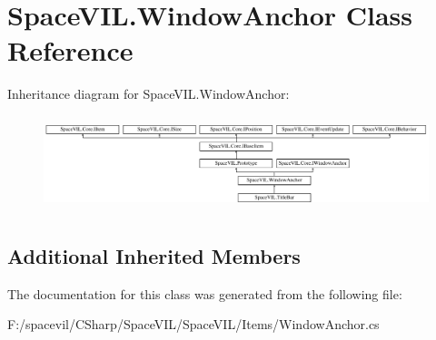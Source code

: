 \hypertarget{class_space_v_i_l_1_1_window_anchor}{}\section{Space\+V\+I\+L.\+Window\+Anchor Class Reference}
\label{class_space_v_i_l_1_1_window_anchor}
Inheritance diagram for Space\+V\+I\+L.\+Window\+Anchor\+:\begin{figure}[H]
\begin{center}
\leavevmode
\includegraphics[height=2.800000cm]{class_space_v_i_l_1_1_window_anchor}
\end{center}
\end{figure}
\subsection*{Additional Inherited Members}


The documentation for this class was generated from the following file\+:\begin{DoxyCompactItemize}
\item 
F\+:/spacevil/\+C\+Sharp/\+Space\+V\+I\+L/\+Space\+V\+I\+L/\+Items/Window\+Anchor.\+cs\end{DoxyCompactItemize}
